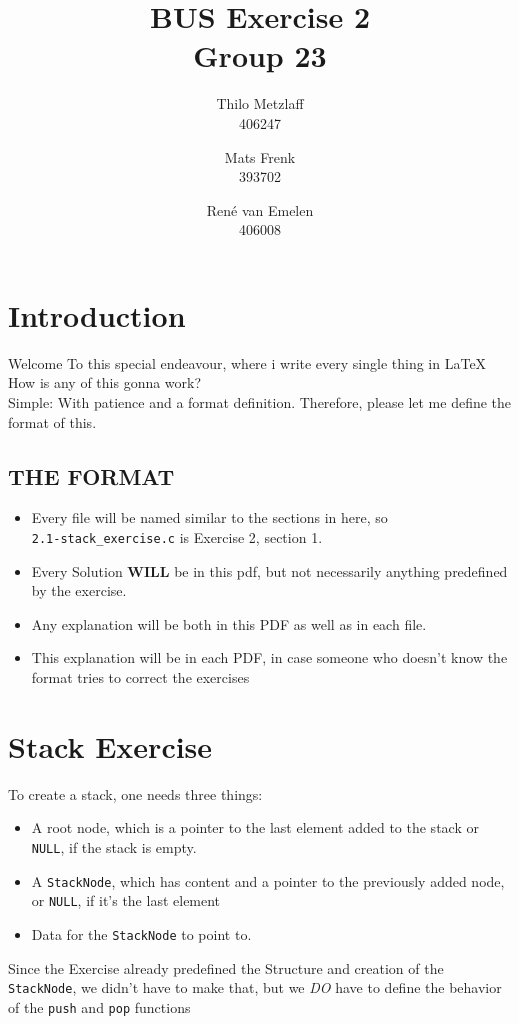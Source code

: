 \documentclass[a4paper, 11pt]{article}
\author{Thilo Metzlaff\\406247 \and Mats Frenk\\393702\and René van Emelen\\406008}
\title{BUS Exercise 2 \\ \Large Group 23}
\begin{document}
    \maketitle
    \newpage

    \tableofcontents
    \newpage

    \section{Introduction}
    Welcome To this special endeavour, where i write every single thing in \LaTeX{}
    How is any of this gonna work?\\
    Simple: With patience and a format definition. Therefore, please let me define the format of this.

    \subsection*{THE FORMAT}
    \begin{itemize}
        \item Every file will be named similar to the sections in here, so\\
              \texttt{2.1-stack\_exercise.c} is Exercise 2, section 1.
        \item Every Solution \textbf{WILL} be in this pdf, but not necessarily 
              anything predefined by the exercise.
        \item Any explanation will be both in this PDF as well as in each file.
        \item This explanation will be in each PDF, in case someone who doesn't
              know the format tries to correct the exercises
    \end{itemize}
    \newpage

    \section{Stack Exercise}
    To create a stack, one needs three things:
    \begin{itemize}
        \item A root node, which is a pointer to the last element added
              to the stack or \lstinline{NULL}, if the stack is empty.
        \item A \texttt{StackNode}, which has content and a pointer to the previously 
              added node, or \lstinline{NULL}, if it's the last element
        \item Data for the \texttt{StackNode} to point to.
    \end{itemize}
    Since the Exercise already predefined the Structure and creation of the \texttt{StackNode}, 
    we didn't have to make that, but we \emph{DO} have to define the behavior of the \texttt{push} and
    \texttt{pop} functions
\end{document}
